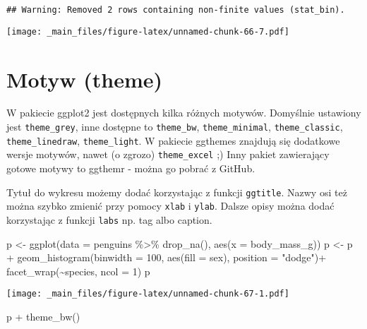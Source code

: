 \documentclass[
]{book}
\newenvironment{Shaded}{\begin{snugshade}}{\end{snugshade}}
\newcommand{\AttributeTok}[1]{\textcolor[rgb]{0.77,0.63,0.00}{#1}}
\newcommand{\DecValTok}[1]{\textcolor[rgb]{0.00,0.00,0.81}{#1}}
\newcommand{\FunctionTok}[1]{\textcolor[rgb]{0.00,0.00,0.00}{#1}}
\newcommand{\NormalTok}[1]{#1}
\newcommand{\OtherTok}[1]{\textcolor[rgb]{0.56,0.35,0.01}{#1}}
\newcommand{\SpecialCharTok}[1]{\textcolor[rgb]{0.00,0.00,0.00}{#1}}
\newcommand{\StringTok}[1]{\textcolor[rgb]{0.31,0.60,0.02}{#1}}
\begin{document}
\begin{verbatim}
## Warning: Removed 2 rows containing non-finite values (stat_bin).
\end{verbatim}

\texttt{[image: \_main\_files/figure-latex/unnamed-chunk-66-7.pdf]}

\hypertarget{motyw-theme}{%
\section{Motyw (theme)}\label{motyw-theme}}

W pakiecie ggplot2 jest dostępnych kilka różnych motywów. Domyślnie ustawiony jest \texttt{theme\_grey}, inne dostępne to \texttt{theme\_bw}, \texttt{theme\_minimal}, \texttt{theme\_classic}, \texttt{theme\_linedraw}, \texttt{theme\_light}. W pakiecie ggthemes znajdują się dodatkowe wersje motywów, nawet (o zgrozo) \texttt{theme\_excel} ;) Inny pakiet zawierający gotowe motywy to ggthemr - można go pobrać z GitHub.

Tytuł do wykresu możemy dodać korzystając z funkcji \texttt{ggtitle}. Nazwy osi też można szybko zmienić przy pomocy \texttt{xlab} i \texttt{ylab}. Dalsze opisy można dodać korzystając z funkcji \texttt{labs} np. tag albo caption.

\begin{Shaded}
\begin{Highlighting}[]
\NormalTok{p }\OtherTok{\textless{}{-}} \FunctionTok{ggplot}\NormalTok{(}\AttributeTok{data =}\NormalTok{ penguins }\SpecialCharTok{\%\textgreater{}\%} \FunctionTok{drop\_na}\NormalTok{(), }\FunctionTok{aes}\NormalTok{(}\AttributeTok{x =}\NormalTok{ body\_mass\_g))}
\NormalTok{p }\OtherTok{\textless{}{-}}\NormalTok{ p }\SpecialCharTok{+} \FunctionTok{geom\_histogram}\NormalTok{(}\AttributeTok{binwidth =} \DecValTok{100}\NormalTok{, }\FunctionTok{aes}\NormalTok{(}\AttributeTok{fill =}\NormalTok{ sex), }\AttributeTok{position =} \StringTok{"dodge"}\NormalTok{)}\SpecialCharTok{+}
  \FunctionTok{facet\_wrap}\NormalTok{(}\SpecialCharTok{\textasciitilde{}}\NormalTok{species, }\AttributeTok{ncol =} \DecValTok{1}\NormalTok{)}
\NormalTok{p}
\end{Highlighting}
\end{Shaded}

\texttt{[image: \_main\_files/figure-latex/unnamed-chunk-67-1.pdf]}

\begin{Shaded}
\begin{Highlighting}[]
\NormalTok{p }\SpecialCharTok{+} \FunctionTok{theme\_bw}\NormalTok{()}
\end{Highlighting}
\end{Shaded}
\end{document}
